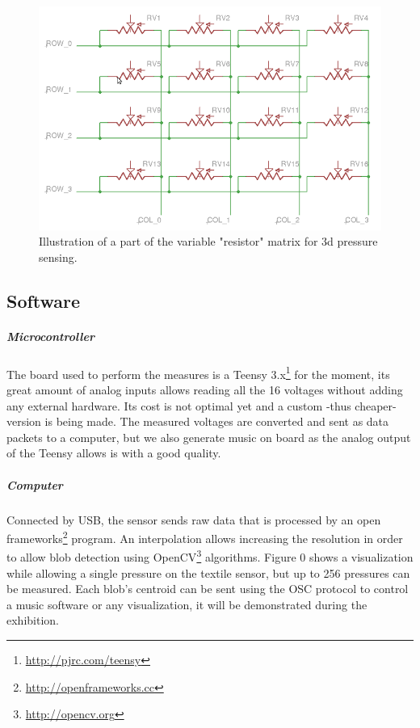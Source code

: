 \documentclass{sigchi-ext}
\begin{document}
\begin{figure}
    \centering
    \includegraphics[width=\columnwidth]{figures/matrix}
    \caption{Illustration of a part of the variable "resistor" matrix for 3d pressure sensing.}\label{fig:matrix}
\end{figure}


\subsection{Software}

\subparagraph{Microcontroller}

The board used to perform the measures is a Teensy 3.x\footnote{\url{http://pjrc.com/teensy}} for the moment, its great amount of analog inputs allows reading all the 16 voltages without adding any external hardware. Its cost is not optimal yet and a custom -thus cheaper- version is being made.
The measured voltages are converted and sent as data packets to a computer, but we also generate music on board as the analog output of the Teensy allows is with a good quality.

\subparagraph{Computer}

Connected by USB, the sensor sends raw data that is processed by an open frameworks\footnote{\url{http://openframeworks.cc}} program.
An interpolation allows increasing the resolution in order to allow blob detection using OpenCV\footnote{\url{http://opencv.org}} algorithms.
Figure 0 shows a visualization while allowing a single pressure on the textile sensor, but up to 256 pressures can be measured.
Each blob's centroid can be sent using the OSC protocol to control a music software or any visualization, it will be demonstrated during the exhibition.
\end{document}
